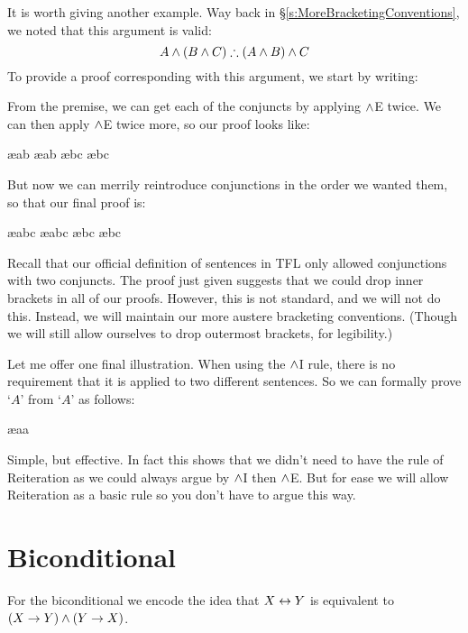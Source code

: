 It is worth giving another example. Way back in \S\ref{s:MoreBracketingConventions}, we noted that this argument is valid:
	$$A \eand (B \eand C) \therefore (A \eand B) \eand C$$
To provide a proof corresponding with this argument, we start by writing:
\begin{pf}
\end{pf}
From the premise, we can get each of the conjuncts by applying $\mathbin{\wedge}$E twice. We can then apply $\mathbin{\wedge}$E twice more, so our proof looks like:
\begin{pf}
	 \ae{ab}
	 \ae{ab}
	 \ae{bc}
	 \ae{bc}
\end{pf}
But now we can merrily reintroduce conjunctions in the order we wanted them, so that our final proof is:
\begin{pf}
	 \ae{abc}
	 \ae{abc}
	 \ae{bc}
	 \ae{bc}
\end{pf}
Recall that our official definition of sentences in TFL only allowed conjunctions with two conjuncts. The proof just given suggests that we could drop inner brackets in all of our proofs. However, this is not standard, and we will not do this. Instead, we will maintain our more austere bracketing conventions. (Though we will still allow ourselves to drop outermost brackets, for legibility.)

Let me offer one final illustration. When using the $\mathbin{\wedge}$I rule, there is no requirement that it is applied to two different sentences. So we can formally prove `$A$' from `$A$' as follows:
\begin{pf}
	\ae{aa}
\end{pf}
Simple, but effective. In fact this shows that we didn't need to have the rule of Reiteration as we could always argue by $\mathbin{\wedge}$I then $\mathbin{\wedge}$E. But for ease we will allow Reiteration as a basic rule so you don't have to argue this way.



\section{Biconditional}

For the biconditional we encode the idea that $X\leftrightarrow Y$ is equivalent to $(X\rightarrow Y)\mathbin{\wedge}(Y\rightarrow X)$.

